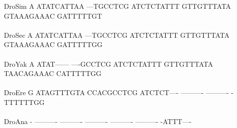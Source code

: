 \documentclass[11pt,twoside,reqno,a4paper]{article}
\begin{document}
{DroSim	A	ATATCATTAA	---TGCCTCG	ATCTCTATTT	GTTGTTTATA	GTAAAGAAAC	GATTTTTGT\\
\hspace*{7\charwidth}\hspace*{1\charwidth}\hspace*{1\charwidth}\hspace*{1\charwidth}\hspace*{1\charwidth}\hspace*{1\charwidth}\hspace*{1\charwidth}\\
DroSec	A	ATATCATTAA	---TGCCTCG	ATCTCTATTT	GTTGTTTATA	GTAAAGAAAC	GATTTTTGG\\
\hspace*{7\charwidth}\hspace*{1\charwidth}\hspace*{1\charwidth}\hspace*{1\charwidth}\hspace*{1\charwidth}\hspace*{1\charwidth}\hspace*{1\charwidth}\\
DroYak	A	ATAT------	----GCCTCG	ATCTCTATTT	GTTGTTTATA	TAACAGAAAC	CATTTTTGG\\
\hspace*{7\charwidth}\hspace*{1\charwidth}\hspace*{1\charwidth}\hspace*{1\charwidth}\hspace*{1\charwidth}\hspace*{1\charwidth}\hspace*{1\charwidth}\\
DroEre	G	ATAGTTTGTA	CCACGCCTCG	ATCTCT----	----------	----------	-TTTTTTGG\\
\hspace*{7\charwidth}\hspace*{1\charwidth}\hspace*{1\charwidth}\hspace*{1\charwidth}\hspace*{1\charwidth}\hspace*{1\charwidth}\hspace*{1\charwidth}\\
DroAna	-	----------	----------	----------	----------	----------	-ATTT----\\
\hspace*{7\charwidth}\hspace*{1\charwidth}\hspace*{1\charwidth}\hspace*{1\charwidth}\hspace*{1\charwidth}\hspace*{1\charwidth}\hspace*{1\charwidth}\\
}
\end{document}

